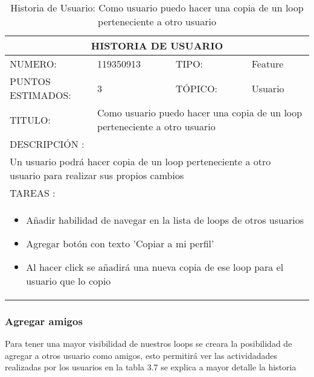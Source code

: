 \begin{table}[h]
\centering
\renewcommand{\arraystretch}{1.4}
\begin{tabular}{|*{4}{l|}}
\hline
\multicolumn{4}{|c|}{HISTORIA DE USUARIO} \\ \hline
NUMERO: & 119350913 & TIPO: & Feature \\ \hline
PUNTOS ESTIMADOS: & 3 & TÓPICO: & Usuario \\ \hline
TITULO: & \multicolumn{3}{|p{7.2cm}|}{Como usuario puedo hacer una copia de un loop perteneciente a otro usuario} \\ \hline
\multicolumn{4}{|l|}{DESCRIPCIÓN : } \\ \hline
\multicolumn{4}{|p{11cm}|}{Un usuario podrá hacer copia de un loop perteneciente a otro usuario para realizar sus propios cambios} \\ \hline
\multicolumn{4}{|l|}{TAREAS : } \\ \hline
\multicolumn{4}{|p{11cm}|}{
\begin{minipage}[t]{\hsize}
  \begin{itemize}
    \item Añadir habilidad de navegar en la lista de loops de otros usuarios
    \item Agregar botón con texto 'Copiar a mi perfil'
    \item Al hacer click se añadirá una nueva copia de ese loop para el usuario que lo copio
  \end{itemize}
\end{minipage}
} \\ \hline
\end{tabular}
\caption{Historia de Usuario: Como usuario puedo hacer una copia de un loop perteneciente a otro usuario}
\label{tab:Primero}
\end{table}

\subsubsection{Agregar amigos}

Para tener una mayor visibilidad de nuestros loops se creara la posibilidad
de agregar a otros usuario como amigos, esto permitirá ver las actividadades
realizadas por los usuarios en la tabla 3.7 se explica a mayor detalle la
historia

